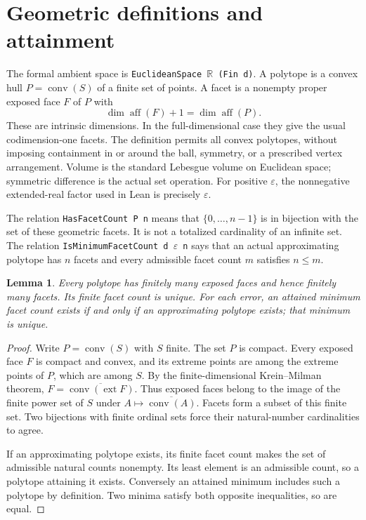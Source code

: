 \documentclass[11pt,letterpaper]{article}
\newtheorem{lemma}{Lemma}
\newcommand{\R}{\mathbb{R}}
\newcommand{\conv}{\operatorname{conv}}
\newcommand{\code}[1]{\texttt{\small #1}}
\begin{document}
\newpage
\section{Geometric definitions and attainment}
The formal ambient space is \code{EuclideanSpace $\R$ (Fin d)}.
A polytope is a convex hull $P=\conv(S)$ of a finite set of points.
A facet is a nonempty proper exposed face $F$ of $P$ with
\[
 \dim\operatorname{aff}(F)+1=\dim\operatorname{aff}(P).
\]
These are intrinsic dimensions. In the full-dimensional case they give
the usual codimension-one facets. The definition permits all convex
polytopes, without imposing containment in or around the ball, symmetry,
or a prescribed vertex arrangement. Volume is the standard Lebesgue
volume on Euclidean space; symmetric difference is the actual set
operation. For positive $\varepsilon$, the nonnegative extended-real
factor used in Lean is precisely $\varepsilon$.

The relation \code{HasFacetCount P n} means that $\{0,\ldots,n-1\}$ is
in bijection with the set of these geometric facets. It is not a
totalized cardinality of an infinite set. The relation
\code{IsMinimumFacetCount d $\varepsilon$ n} says that an actual
approximating polytope has $n$ facets and every admissible facet count
$m$ satisfies $n\leq m$.

\begin{lemma}\label{lem:finite}
Every polytope has finitely many exposed faces and hence finitely many
facets. Its finite facet count is unique. For each error, an attained
minimum facet count exists if and only if an approximating polytope
exists; that minimum is unique.
\end{lemma}
\begin{proof}
Write $P=\conv(S)$ with $S$ finite. The set $P$ is compact. Every exposed
face $F$ is compact and convex, and its extreme points are among the
extreme points of $P$, which are among $S$. By the finite-dimensional
Krein--Milman theorem,
$F=\overline{\conv(\operatorname{ext}F)}$.
Thus exposed faces belong to the image of the finite power set of $S$
under $A\mapsto\overline{\conv(A)}$. Facets form a subset of this finite
set. Two bijections with finite ordinal sets force their natural-number
cardinalities to agree.

If an approximating polytope exists, its finite facet count makes the
set of admissible natural counts nonempty. Its least element is an
admissible count, so a polytope attaining it exists. Conversely an
attained minimum includes such a polytope by definition. Two minima
satisfy both opposite inequalities, so are equal.
\end{proof}
\end{document}
